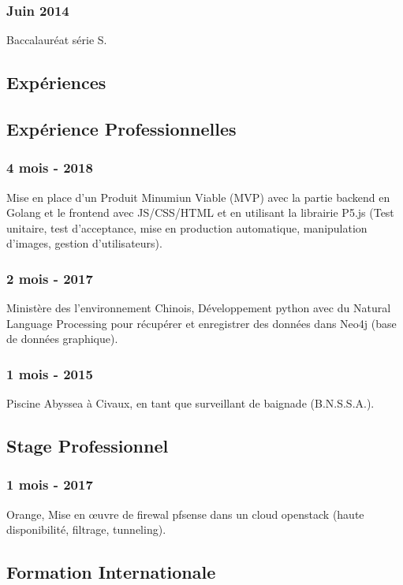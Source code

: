 \documentclass{article}
\begin{document}
        \subsubsection{Juin 2014}
            Baccalaur\'eat s\'erie S.

    \vspace{1cm}

    \begin{multicols}{2}
        \section{Exp\'eriences}
            \subsection{Exp\'erience Professionnelles}
                \subsubsection{4 mois - 2018}
                    Mise en place d'un Produit Minumiun Viable (MVP) avec la partie backend en Golang et le frontend avec JS/CSS/HTML et en utilisant la librairie P5.js (Test unitaire, test d'acceptance, mise en production automatique, manipulation d'images, gestion d'utilisateurs).
                \subsubsection{2 mois - 2017}
                    Minist\`ere des l'environnement Chinois, D\'eveloppement python avec du Natural Language Processing pour r\'ecup\'erer et enregistrer des donn\'ees dans Neo4j (base de donn\'ees graphique).
                \subsubsection{1 mois - 2015}
                    Piscine Abyssea \`a Civaux, en tant que surveillant de baignade (B.N.S.S.A.).
            \subsection{Stage Professionnel}
                \subsubsection{1 mois - 2017}
                    Orange, Mise en \oe{}uvre de firewal pfsense dans un cloud openstack (haute disponibilit\'e, filtrage, tunneling).
            \subsection{Formation Internationale}

\end{multicols}
\end{document}
